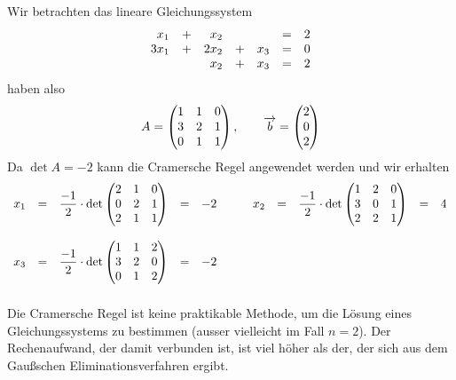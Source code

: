 \begin{beispiel} Wir betrachten das lineare Gleichungssystem
 	 $$ \begin{array} {r c r c r c l}
  	x_1  & + & x_2 & & & = & 2 \\
  	3x_1 & + & 2x_2 & + & x_3 & = & 0 \\
  	& & x_2 & + & x_3 & = & 2 
  	\end{array} $$
haben also 
  	$$ A = \left( \begin{matrix} 1 & 1 & 0 \\ 3 & 2 & 1 \\ 0 & 1 & 1
   	\end{matrix} \right), \qquad \overrightarrow{b} 
    	= \left( \begin{matrix} 2 \\ 0 \\ 2 \end{matrix} \right) $$ 
Da $\det{A} = -2$ kann die Cramersche Regel angewendet werden und wir erhalten
  	$$ \begin{array}{l c l c l c c l c l c l }
  	x_1 & = & \dfrac {-1}{2} \cdot \det{ \begin{matrix} 2 & 1 & 0 \\ 0 & 2 & 1 \\ 2 & 1 & 1 
    	\end{matrix} } & = & - 2 & \quad &
  	x_2 & = & \dfrac {-1}{2} \cdot \det{ \begin{matrix} 1 & 2 & 0 \\ 3 & 0 & 1 \\ 2 & 2 & 1 
    	\end{matrix} } & = & 4 \\
  	x_3 & = &  \dfrac {-1}{2} \cdot \det{ \begin{matrix} 1 & 1 & 2 \\ 3 & 2 & 0 \\ 0 & 1 & 2 
    	\end{matrix} } & = & -2
 	\end{array} $$
\end{beispiel}

\begin{notiz} Die Cramersche Regel ist keine praktikable Methode, um die Lösung eines 
Gleichungssystems zu bestimmen (ausser vielleicht im Fall $n = 2$). Der Rechenaufwand, der 
damit verbunden ist, ist viel höher als der, der sich aus dem Gaußschen 
Eliminationsverfahren ergibt.
\end{notiz}

\bigbreak

